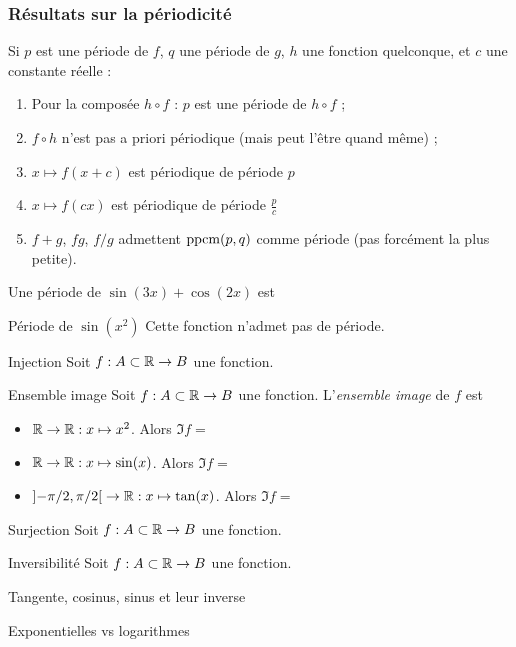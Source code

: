 \documentclass[french,t,handout,xcolor=svgnames]{beamer}
\begin{document}
\begin{frame}
  \frametitle{Résultats sur la périodicité}
  Si \(p\) est une période de \(f\), \(q\) une période de \(g\), \(h\) une fonction quelconque, et \(c\) une constante réelle :
  \begin{enumerate}[<+->]
  \item Pour la composée \(h\circ f\) : \(p\) est une période de \(h\circ f\) ;
  \item \(f\circ h\) n'est pas a priori périodique (mais peut l'être quand même) ;
  \item \(x \mapsto f(x+c)\) est périodique de période \(p\)%
  \item \(x \mapsto f(cx)\) est périodique de période \(\frac pc\)%
  \item \(f+g\), \(fg\), \(f/g\) admettent \(\operatorname{ppcm}(p,q)\) comme période (pas forcément la plus petite).
  \end{enumerate}
  \begin{example}
    Une période de \(\sin(3x) + \cos(2x)\) est
  \end{example}
\end{frame}

\begin{frame}{Période de $\sin(x^{2})$}
 Cette fonction n'admet pas de période.
\end{frame}
\begin{frame}{Injection}
  Soit $f : A \subset \mathbb{R} \to B$ une fonction.
  

\end{frame}
\begin{frame}{Ensemble image}
  Soit $f : A \subset \mathbb{R} \to B$ une fonction. L'\emph{ensemble image} de $f$ est

  \vspace{2cm}

  \begin{itemize}
  \item $\mathbb{R} \to \mathbb{R} : x \mapsto x^{2}$. Alors $\Im f = $
  \item $\mathbb{R} \to \mathbb{R} : x \mapsto \sin (x)$. Alors $\Im f = $
  \item $\interoo{-\pi/2,\pi/2} \to \RR : x \mapsto \tan (x)$. Alors $\Im f = $
  \end{itemize}
\end{frame}
\begin{frame}{Surjection}
  Soit $f : A \subset \mathbb{R} \to B$ une fonction.  
\end{frame}
\begin{frame}{Inversibilité}
  Soit $f : A \subset \mathbb{R} \to B$ une fonction.

\end{frame}
\begin{frame}{Tangente, cosinus, sinus et leur inverse}
  
\end{frame}
\begin{frame}{Exponentielles vs logarithmes}

\end{frame}
\end{document}
